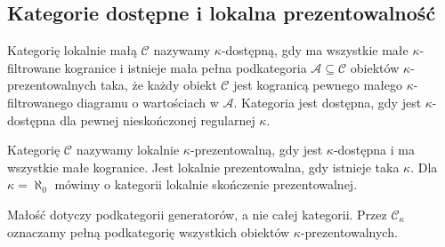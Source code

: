 \subsection{Kategorie dostępne i lokalna prezentowalność}

\begin{definicja}[Dostępność]\label{cat:def:accessible-category}
Kategorię lokalnie małą $\mathcal C$ nazywamy $\kappa$-dostępną, gdy ma wszystkie małe $\kappa$-filtrowane kogranice i istnieje mała pełna podkategoria $\mathcal A\subseteq\mathcal C$ obiektów $\kappa$-prezentowalnych taka, że każdy obiekt $\mathcal C$ jest kogranicą pewnego małego $\kappa$-filtrowanego diagramu o wartościach w $\mathcal A$. Kategoria jest dostępna, gdy jest $\kappa$-dostępna dla pewnej nieskończonej regularnej $\kappa$.
\end{definicja}

\begin{definicja}\label{cat:def:accessible-locally-presentable}
Kategorię $\mathcal C$ nazywamy lokalnie $\kappa$-prezentowalną, gdy jest $\kappa$-dostępna i ma wszystkie małe kogranice. Jest lokalnie prezentowalna, gdy istnieje taka $\kappa$. Dla $\kappa=\aleph_0$ mówimy o kategorii lokalnie skończenie prezentowalnej.
\end{definicja}

Małość dotyczy podkategorii generatorów, a nie całej kategorii. Przez $\mathcal C_\kappa$ oznaczamy pełną podkategorię wszystkich obiektów $\kappa$-prezentowalnych.

